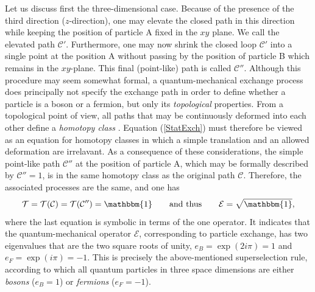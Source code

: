 \documentclass[10pt]{book}
\newcommand{\bone}{\mathbbm{1}}
\newcommand{\Cmath}{\mathcal{C}}
\newcommand{\Tmath}{\mathcal{T}}
\newcommand{\Emath}{\mathcal{E}}
\newcommand{\beq}{\begin{equation}}
\newcommand{\eeq}{\end{equation}}
\begin{document}
Let us discuss first the three-dimensional case. Because of the presence 
of the third direction ($z$-direction), one may elevate the closed
path in this direction while keeping the position of particle A fixed in the $xy$ plane. We call the elevated path $\Cmath'$.
Furthermore, one may now shrink the closed loop $\Cmath'$ into a single point at the position A without passing by the position
of particle B which remains in the $xy$-plane. This final (point-like) path is called $\Cmath''$.
Although this procedure may seem somewhat formal, a quantum-mechanical exchange process does principally not specify 
the exchange path in order to define whether a particle is a boson or a fermion, but only its {\sl topological} properties.
From a topological point of view, all paths that may be continuously deformed into each other define a {\sl homotopy class}
\cite{mermin}. 
Equation (\ref{StatExch}) must therefore be viewed as an equation for homotopy classes in which a simple translation 
and an allowed deformation are irrelavant.
As a consequence of these considerations, the simple point-like path $\Cmath''$ 
at the position of particle A, which may be formally described by 
$\Cmath''=1$, is in the same homotopy class as the original path $\Cmath$. Therefore, the associated processes
are the same, and one has 
\beq\label{BosFermStat}
\Tmath=\Tmath(\Cmath)=\Tmath(\Cmath'')=\bone \qquad {\rm and~thus}\qquad \Emath=\sqrt{\bone},
\eeq
where the last equation is symbolic in terms of the one operator. It indicates that the quantum-mechanical operator
$\Emath$, corresponding to particle exchange,
has two eigenvalues that are the two square roots of unity, $e_B=\exp(2i\pi)=1$ and $e_F=\exp(i\pi)=-1$. This
is precisely the above-mentioned superselection rule, according to which all quantum particles in three space dimensions
are either {\sl bosons} ($e_B=1$) or {\sl fermions} ($e_F=-1$). 
\end{document}
